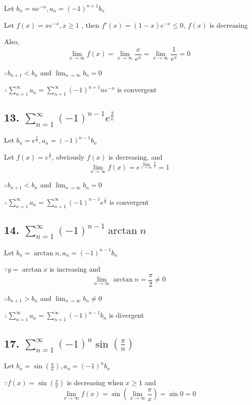 \documentclass{article}
\begin{document}
    Let $b_n = ne^{-n}, a_n = (-1)^{n+1}b_n$

    Let $f(x) = xe^{-x}, x \geq 1$ , then $ f'(x) = (1-x)e^{-x} \leq 0$, $f(x)$ is decreasing

    Also, $$\lim_{x\to\infty}f(x) = \lim_{x\to\infty}\frac{x}{e^x} = \lim_{x\to\infty}\frac{1}{e^x} = 0$$

    $\therefore b_{n+1} < b_n$ and $\lim_{n\to\infty}b_n = 0$

    $\therefore \sum_{n=1}^\infty a_n = \sum_{n=1}^\infty (-1)^{n+1} ne^{-n}$ is convergent

    \subsection*{13. $\sum_{n=1}^\infty (-1)^{n-1} e^{\frac 2 n}$}

    Let $b_n = e^{\frac 2 n}, a_n = (-1)^{n-1}b_n$

    Let $f(x) = e^{\frac 2 x}$, obviously $f(x)$ is decreasing, and $$\lim_{x\to\infty}f(x) = e^{\lim_{x\to\infty}\frac 2 x} = 1$$

    $\therefore b_{n+1} < b_n$ and $\lim_{n\to\infty}b_n = 0$

    $\therefore \sum_{n=1}^\infty a_n = \sum_{n=1}^\infty (-1)^{n-1}e^{\frac 2 n}$ is convergent

    \subsection*{14. $\sum_{n=1}^\infty (-1)^{n-1} \arctan n$}

    Let $b_n = \arctan n, a_n = (-1)^{n-1} b_n$

    $\because y = \arctan x$ is increasing and $$\lim_{n\to\infty}\arctan n = \frac \pi 2 \not = 0$$

    $\therefore b_{n+1} > b_n$ and $\lim_{n\to\infty}b_n \not = 0$

    $\therefore \sum_{n=1}^\infty a_n = \sum_{n=1}^\infty (-1)^{n-1}b_n$ is divergent

    \subsection*{17. $\sum_{n=1}^\infty (-1)^n\sin(\frac \pi n)$}

    Let $b_n = \sin (\frac \pi n), a_n = (-1)^{n} b_n$

    $\because f(x) = \sin (\frac \pi x)$ is decreasing when $x \geq 1$ and $$\lim_{x\to\infty}f(x) = \sin(\lim_{x\to\infty} \frac{\pi}{x}) = \sin 0 = 0$$
\end{document}

